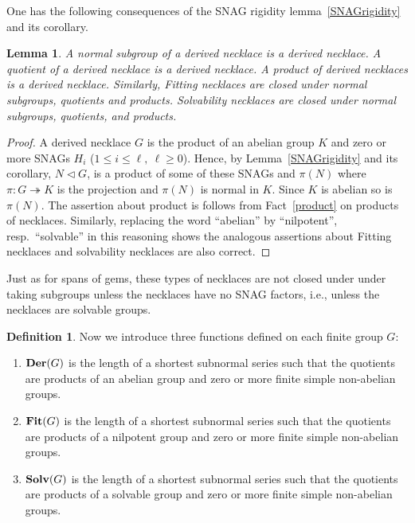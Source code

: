 \documentclass[a4paper,11pt]{amsart}
\newtheorem{lemma}[theorem]{Lemma}
\theoremstyle{definition}
\newtheorem{definition}[theorem]{Definition}
\newcommand{\Fit}{{\bf Fit}}
\newcommand{\Der}{{\bf Der}}
\newcommand{\Solv}{{\bf Solv}}
\newcommand{\sur}{\twoheadrightarrow}
\newcommand{\1}{{\mathbf 1}}
\begin{document}
One has the following consequences of the SNAG rigidity lemma~\ref{SNAGrigidity} and its corollary.
\begin{lemma}\label{VariantSoG}
A normal subgroup of a derived necklace is a derived necklace.  A quotient of a derived necklace is a derived necklace.   A product of derived necklaces is a derived necklace.
Similarly, Fitting necklaces are closed under normal subgroups, quotients and products.  
Solvability necklaces are closed under normal subgroups, quotients, and products. 
\end{lemma}
\begin{proof} 
A derived necklace $G$ is the product of an abelian group $K$ and zero or more SNAGs $H_i$ ($1 \leq i \leq \ell,\ \ell\geq 0$).  Hence, by Lemma~\ref{SNAGrigidity} and its corollary, $N\lhd G$, is a product of some of these SNAGs and $\pi(N)$ where $\pi : G\sur K$ is the projection and $\pi(N)$ is normal in $K$. Since $K$ is abelian so is $\pi(N)$. The assertion about product is follows from Fact~\ref{product} on products of necklaces. Similarly, replacing the word ``abelian'' by ``nilpotent'', resp.\ ``solvable'' in this reasoning shows the analogous assertions about Fitting necklaces and solvability necklaces are also correct.
\end{proof}

Just as for spans of gems, these types of necklaces are not closed under under taking subgroups unless the necklaces have no SNAG factors, i.e., unless the necklaces are solvable groups.\\

\begin{definition}
Now we introduce three functions defined on each finite group $G$: 
\begin{enumerate}
\item $\Der(G)$ is the length of a shortest subnormal series such that the quotients are products of an abelian group and zero or more finite simple non-abelian groups.
\item $\Fit(G)$ is the length of a shortest subnormal series such that the quotients are products of a nilpotent group and zero or more finite simple non-abelian groups.
\item $\Solv(G)$ is the length of a shortest subnormal series such that the quotients are products of a solvable group and zero or more finite simple non-abelian groups.
\end{enumerate}
\end{definition}
\end{document}
